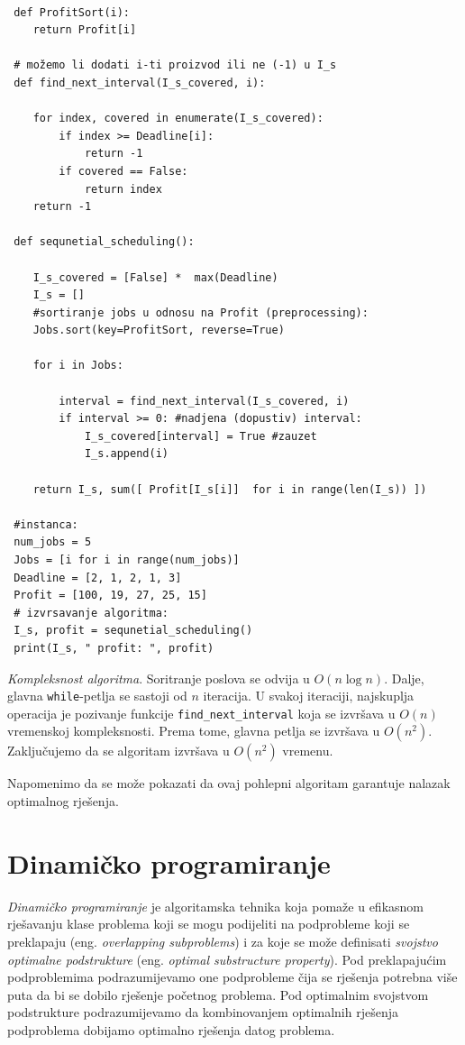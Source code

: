  \begin{verbatim}
 
 def ProfitSort(i):
 	return Profit[i]
 
 # možemo li dodati i-ti proizvod ili ne (-1) u I_s
 def find_next_interval(I_s_covered, i):
 
 	for index, covered in enumerate(I_s_covered):
 		if index >= Deadline[i]:
 			return -1
 		if covered == False:
 			return index
 	return -1        
 
 def sequnetial_scheduling():
 
 	I_s_covered = [False] *  max(Deadline) 
 	I_s = []
 	#sortiranje jobs u odnosu na Profit (preprocessing):
 	Jobs.sort(key=ProfitSort, reverse=True)

 	for i in Jobs:
 
 		interval = find_next_interval(I_s_covered, i)
 		if interval >= 0: #nadjena (dopustiv) interval:
 			I_s_covered[interval] = True #zauzet
 			I_s.append(i)
 
 	return I_s, sum([ Profit[I_s[i]]  for i in range(len(I_s)) ])
 
 #instanca:
 num_jobs = 5
 Jobs = [i for i in range(num_jobs)]
 Deadline = [2, 1, 2, 1, 3]
 Profit = [100, 19, 27, 25, 15]
 # izvrsavanje algoritma:
 I_s, profit = sequnetial_scheduling()
 print(I_s, " profit: ", profit)
 \end{verbatim}

\textit{Kompleksnost algoritma}. Soritranje poslova se odvija u $O(n \log n)$. Dalje, glavna \texttt{while}-petlja se sastoji od $n$ iteracija. U svakoj iteraciji, najskuplja operacija je pozivanje funkcije \texttt{find\_next\_interval} koja se izvršava u $O(n)$ vremenskoj kompleksnosti. Prema tome,   glavna petlja se izvršava u $O(n^2)$. Zaključujemo da se algoritam izvršava u $O(n^2)$ vremenu. 

Napomenimo da se može pokazati da ovaj pohlepni algoritam garantuje nalazak optimalnog rješenja.

\section{Dinamičko programiranje} 

\textit{Dinamičko programiranje} je algoritamska tehnika koja pomaže u efikasnom rješavanju klase problema koji se mogu podijeliti na podprobleme koji se preklapaju (eng. \textit{overlapping subproblems}) i za koje se može definisati \emph{svojstvo optimalne podstrukture} (eng. \textit{optimal substructure property}). Pod preklapajućim podproblemima podrazumijevamo 
one podprobleme čija se rješenja  potrebna više puta da bi se dobilo rješenje početnog problema. Pod optimalnim svojstvom podstrukture   podrazumijevamo da kombinovanjem optimalnih rješenja podproblema dobijamo  optimalno  rješenja datog problema. 

